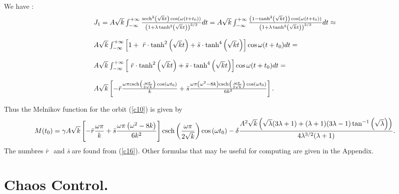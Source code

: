 \documentclass{ws-ijbc}
\begin{document}
We have :%
\begin{equation}
\begin{tabular}{l}
$J_{1}=A\sqrt{k}\int_{-\infty }^{+\infty }\frac{\text{sech}^{2}\left( \sqrt{k%
}t\right) \cos \left( \omega \left( t+t_{0}\right) \right) }{\left(
1+\lambda \tanh ^{2}\left( \sqrt{k}t\right) \right) ^{3/2}}dt=A\sqrt{k}%
\int_{-\infty }^{+\infty }\frac{\left( 1-\text{tanh}^{2}\left( \sqrt{k}%
t\right) \right) \cos \left( \omega \left( t+t_{0}\right) \right) }{\left(
1+\lambda \tanh ^{2}\left( \sqrt{k}t\right) \right) ^{3/2}}dt\approx $ \\ 
\\ 
$A\sqrt{k}\int_{-\infty }^{+\infty }\left[ 1+~\bar{r}\cdot \text{tanh}%
^{2}\left( \sqrt{k}t\right) +\bar{s}\cdot \text{tanh}^{4}\left( \sqrt{k}%
t\right) \right] \cos \omega (t+t_{0})dt=$ \\ 
\\ 
$A\sqrt{k}\int_{-\infty }^{+\infty }\left[ ~\bar{r}\cdot \text{tanh}%
^{2}\left( \sqrt{k}t\right) +\bar{s}\cdot \text{tanh}^{4}\left( \sqrt{k}%
t\right) \right] \cos \omega (t+t_{0})dt=$ \\ 
\\ 
$A\sqrt{k}\left[ -\bar{r}\frac{\omega \pi \text{csch}\left( \frac{\omega \pi 
}{2\sqrt{k}}\right) \cos \left( \omega t_{0}\right) }{k}+\bar{s}\frac{\omega
\pi \left( \omega ^{2}-8k\right) \text{csch}\left( \frac{\omega \pi }{2\sqrt{%
k}}\right) \cos \left( \omega t_{0}\right) }{6k^{2}}\right] .$%
\end{tabular}
\label{c17}
\end{equation}

\bigskip Thus the Melnikov function for the orbit (\ref{c10}) is given by 
\begin{equation}
M(t_{0})=\gamma A\sqrt{k}\left[ -\bar{r}\frac{\omega \pi }{k}+\bar{s}\frac{%
\omega \pi \left( \omega ^{2}-8k\right) }{6k^{2}}\right] \text{csch}\left( 
\frac{\omega \pi }{2\sqrt{k}}\right) \cos \left( \omega t_{0}\right) -\delta 
\frac{A^{2}\sqrt{k}\left( \sqrt{\lambda }(3\lambda +1)+(\lambda +1)(3\lambda
-1)\tan ^{-1}\left( \sqrt{\lambda }\right) \right) }{4\lambda ^{3/2}(\lambda
+1)}.  \label{c18}
\end{equation}%
The numbres $\bar{r}~$\ and $\bar{s}~$are found from (\ref{c16}). Other
formulas that may be useful for computing are given in the Appendix.

\section{Chaos Control.}
\end{document}
